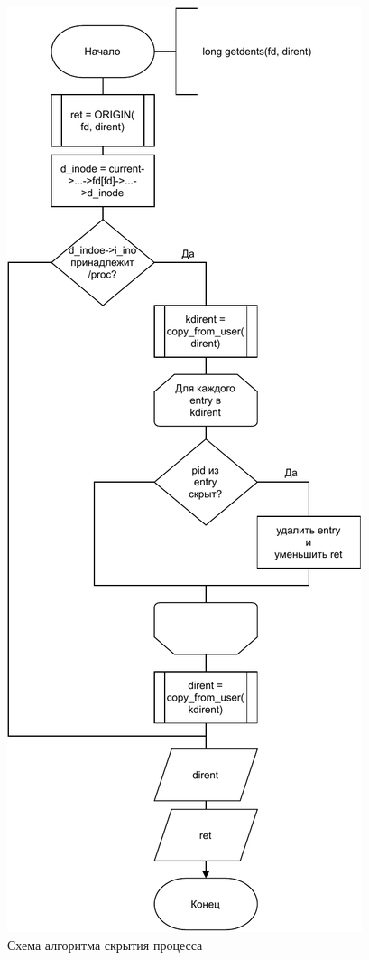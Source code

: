 \begin{figure}[H]
    \centering
    \includegraphics[scale=0.65]{pdf/oscw_proc.pdf}
    \caption{Схема алгоритма скрытия процесса}\label{img:proc_hide_scheme}
\end{figure}

